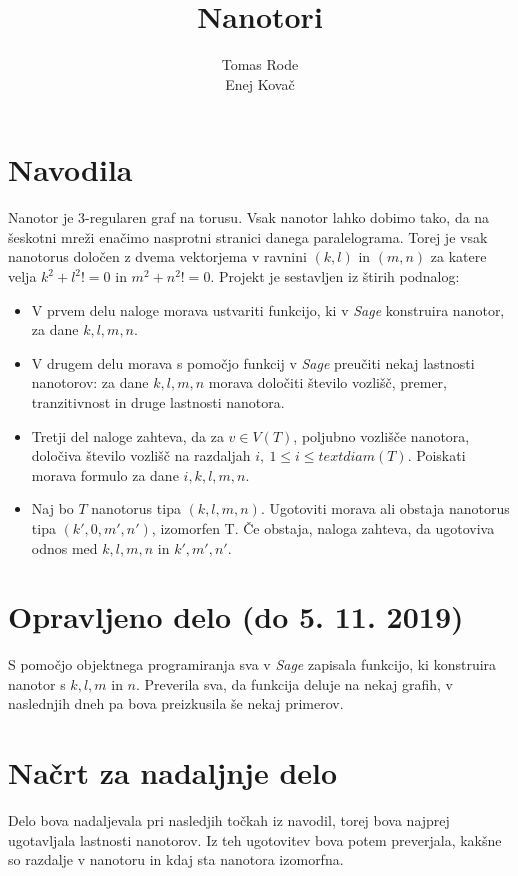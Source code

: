 \documentclass[a4paper, 12 pt]{article}
\title{Nanotori}
\author{Tomas Rode \\ Enej Kovač}
\begin{document}
\maketitle

\section{Navodila}

Nanotor je 3-regularen graf na torusu. Vsak nanotor lahko dobimo tako, da na šeskotni mreži enačimo nasprotni stranici danega paralelograma. Torej je vsak nanotorus določen z dvema vektorjema v ravnini $(k,l)$ in $(m, n)$ za katere velja $k^2 + l^2 != 0$ in $m^2 + n^2 != 0$. Projekt je sestavljen iz štirih podnalog:

\begin{itemize}
  \item V prvem delu naloge morava ustvariti funkcijo, ki v \textit{Sage} konstruira nanotor, za dane $k, l, m, n$.
  \item V drugem delu morava s pomočjo funkcij v \textit{Sage} preučiti nekaj lastnosti nanotorov: za dane $k, l, m, n$ morava določiti število vozlišč, premer, tranzitivnost in druge lastnosti nanotora.
  \item Tretji del naloge zahteva, da za $v \in V(T)$, poljubno vozlišče nanotora, določiva število vozlišč na razdaljah $i,\ 1 \leq i \leq text{diam}(T)$. Poiskati morava formulo za dane $i, k, l, m, n$.
  \item Naj bo $T$ nanotorus tipa $(k, l, m, n)$. Ugotoviti morava ali obstaja nanotorus tipa $(k', 0, m', n')$, izomorfen T. Če obstaja, naloga zahteva, da ugotoviva odnos med $k, l, m, n$ in $k', m', n'$.
\end{itemize}

\section{Opravljeno delo (do 5. 11. 2019)}

S pomočjo objektnega programiranja sva v \textit{Sage} zapisala funkcijo, ki konstruira nanotor s $k, l, m$ in $n$. Preverila sva, da funkcija deluje na nekaj grafih, v naslednjih dneh pa bova preizkusila še nekaj primerov.

\section{Načrt za nadaljnje delo}

Delo bova nadaljevala pri nasledjih točkah iz navodil, torej bova najprej ugotavljala lastnosti nanotorov. Iz teh ugotovitev bova potem preverjala, kakšne so razdalje v nanotoru in kdaj sta nanotora izomorfna.
\end{document}
